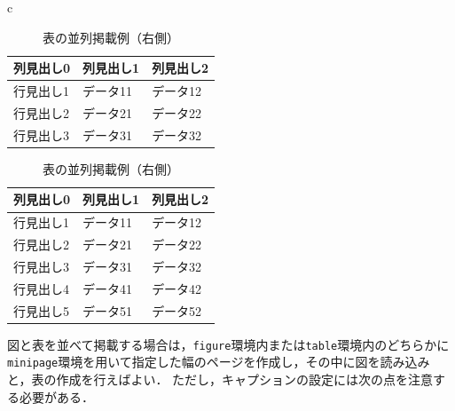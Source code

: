 \documentclass[a4j,11pt]{ujreport}
\begin{document}
\begin{table}[ht]
	\centering
	\begin{tabular}{c}
		\begin{minipage}[t]{0.5\hsize}
			\centering 
			\caption{表の並列掲載例（左側）}
			\label{tab:ExampleParallelTableLeft}
			\small
			\begin{tabular}{l|ll}
				\Hline 
				列見出し0 & 列見出し1 & 列見出し2\\ 
				\hline\hline
				行見出し1 & データ11 & データ12\\
				行見出し2 & データ21 & データ22\\
				行見出し3 & データ31 & データ32\\
				\hline 
			\end{tabular} 
		\end{minipage}%
		\begin{minipage}[t]{0.5\hsize}
			\centering 
			\caption{表の並列掲載例（右側）}
			\label{tab:ExampleParallelTableRight}
			\small
			\begin{tabular}{l|ll}
				\Hline 
				列見出し0 & 列見出し1 & 列見出し2\\ 
				\hline\hline
				行見出し1 & データ11 & データ12\\
				行見出し2 & データ21 & データ22\\
				行見出し3 & データ31 & データ32\\
				行見出し4 & データ41 & データ42\\
				行見出し5 & データ51 & データ52\\
				\hline 
			\end{tabular} 
		\end{minipage}
	\end{tabular}
\end{table}

図と表を並べて掲載する場合は，\texttt{figure}環境内または\texttt{table}環境内のどちらかに\texttt{minipage}環境を用いて指定した幅のページを作成し，その中に図を読み込みと，表の作成を行えばよい．
ただし，キャプションの設定には次の点を注意する必要がある．
\end{document}
